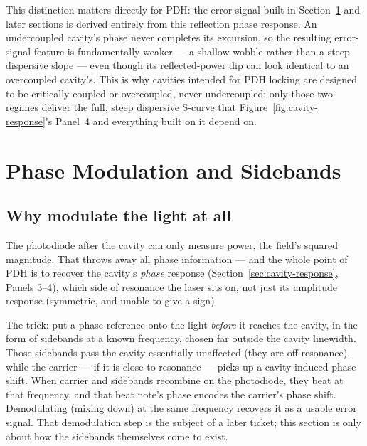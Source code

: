 \documentclass[9pt]{article}
\begin{document}
This distinction matters directly for PDH: the error signal built in
Section~\ref{sec:sidebands} and later sections is derived entirely from this
reflection phase response. An undercoupled cavity's phase never completes
its excursion, so the resulting error-signal feature is fundamentally
weaker --- a shallow wobble rather than a steep dispersive slope --- even
though its reflected-power dip can look identical to an overcoupled
cavity's. This is why cavities intended for PDH locking are designed to be
critically coupled or overcoupled, never undercoupled: only those two
regimes deliver the full, steep dispersive S-curve that
Figure~\ref{fig:cavity-response}'s Panel~4 and everything built on it
depend on.

\section{Phase Modulation and Sidebands}
\label{sec:sidebands}
\subsection{Why modulate the light at all}
\label{sec:sidebands-motivation}
The photodiode after the cavity can only measure power, the field's squared
magnitude. That throws
away all phase information --- and the whole point of PDH is to recover the
cavity's \emph{phase} response (Section~\ref{sec:cavity-response}, Panels
3--4), which side of resonance the laser sits on, not just its amplitude
response (symmetric, and unable to give a sign).

The trick: put a phase reference onto the light \emph{before} it reaches the
cavity, in the form of sidebands at a known frequency, chosen far
outside the cavity linewidth. Those sidebands pass the cavity essentially
unaffected (they are off-resonance), while the carrier --- if it is close to
resonance --- picks up a cavity-induced phase shift. When carrier and
sidebands recombine on the photodiode, they beat at that frequency, and that
beat note's phase encodes the carrier's phase shift. Demodulating (mixing
down) at the same frequency recovers it as a usable error signal. That
demodulation step is the subject of a later ticket; this section is only
about how the sidebands themselves come to exist.
\end{document}
